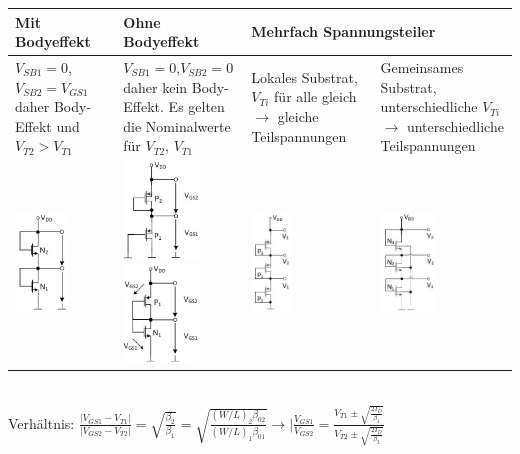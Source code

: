 \begin{tabular}{|p{}|p{}|p{}|p{}|}
	\hline
	\textbf{Mit Bodyeffekt}&\textbf{Ohne Bodyeffekt}&\multicolumn{2}{l|}{\textbf{Mehrfach Spannungsteiler}}\\ \hline
	$V_{SB1}=0$, $V_{SB2}=V_{GS1}$ daher Body-Effekt und $V_{T2} > V_{T1}$&$V_{SB1}=0$,$V_{SB2}=0$ daher kein Body-Effekt. Es gelten die Nominalwerte für $V_{T2}$, $V_{T1}$&Lokales Substrat, $V_{Ti}$ für alle gleich $\rightarrow$ gleiche Teilspannungen&Gemeinsames Substrat, unterschiedliche $V_{Ti}$ $\rightarrow$ unterschiedliche Teilspannungen\\
	\includegraphics[height=2.6cm]{chapters/Diode/images/SpgT_N_Bodyeffekt}&
	\includegraphics[height=2.6cm]{chapters/Diode/images/SpgT_P_body}
	\includegraphics[height=2.6cm]{chapters/Diode/images/SpgT_PN}&
	\includegraphics[height=2.6cm]{chapters/Diode/images/SpgT_P3}&
	\includegraphics[height=2.6cm]{chapters/Diode/images/SpgT_N3}\\    
	\hline	
\end{tabular} \\ [1ex]
Verhältnis: $\frac{|V_{GS1}-V_{T1}|}{|V_{GS2}-V_{T2}|}=\sqrt{\frac{\beta_2}{\beta_1}}=\sqrt{\frac{(W/L)_2\beta_{02}}{{(W/L)_1\beta_{01}}}}\rightarrow |\frac{V_{GS1}}{V_{GS2}}=\frac{V_{T1}\pm\sqrt{\frac{2I_D}{\beta_1}}}{V_{T2}\pm\sqrt{\frac{2I_D}{\beta_2}}}$
